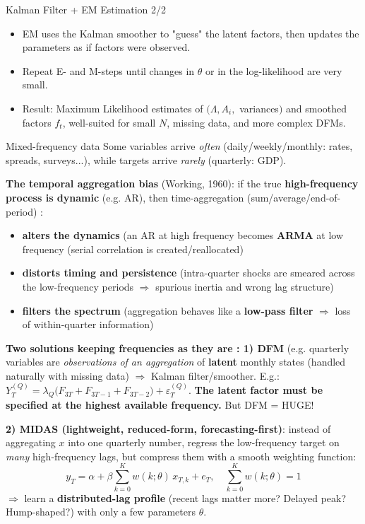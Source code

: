 \documentclass{beamer}
\begin{document}
\begin{frame}[label=em-intuition]{Kalman Filter + EM Estimation 2/2}
\medskip


\begin{itemize}
  \item EM uses the Kalman smoother to "guess" the latent factors,
        then updates the parameters as if factors were observed.
  \item Repeat E- and M-steps until changes in $\theta$ or in the log-likelihood are very small.
  \item Result: Maximum Likelihood estimates of $(\Lambda, A_i,$ variances$)$ and smoothed factors $f_t$,
        well-suited for small $N$, missing data, and more complex DFMs.
\end{itemize}

\end{frame}



\begin{frame}[label=MF]{Mixed-frequency data}
\scriptsize
Some variables arrive \emph{often} (daily/weekly/monthly: rates, spreads, surveys...), while targets arrive \emph{rarely} (quarterly: GDP).

\medskip
\textbf{The temporal aggregation bias} (Working, 1960): if the true\textbf{ high-frequency process is dynamic} (e.g. AR), then time-aggregation (sum/average/end-of-period) :
\begin{itemize}
\item \textbf{alters the dynamics} (an AR at high frequency becomes \textbf{ARMA} at low frequency (serial correlation is created/reallocated)
\item \textbf{distorts timing and persistence} (intra-quarter shocks are smeared across the low-frequency periods $\Rightarrow$ spurious inertia and wrong lag structure)
\item \textbf{filters the spectrum} (aggregation behaves like a \textbf{low-pass filter} $\Rightarrow$ loss of within-quarter information)
\end{itemize}

\textbf{Two solutions keeping frequencies as they are : 1) DFM} (e.g. quarterly variables are \emph{observations of an aggregation} of\textbf{ latent} monthly states (handled naturally with missing data) $\Rightarrow$ Kalman filter/smoother. E.g.: $Y_T^{(Q)} = \lambda_Q \bigl( F_{3T} + F_{3T-1} + F_{3T-2} \bigr) + \varepsilon_T^{(Q)}$. \textbf{The latent factor must be specified at the highest available frequency.} But DFM = HUGE!

\medskip
\textbf{2) MIDAS (lightweight, reduced-form, forecasting-first)}: instead of aggregating $x$ into one quarterly number, regress the low-frequency target on \emph{many} high-frequency lags, but compress them with a smooth weighting function:
\[
y_T = \alpha + \beta \sum_{k=0}^{K} w(k;\theta)\, x_{T,k} + e_T,
\quad
\sum_{k=0}^K w(k;\theta)=1
\]
$\Longrightarrow$ learn a \textbf{distributed-lag profile} (recent lags matter more? Delayed peak? Hump-shaped?) with only a few parameters $\theta$.
\end{frame}
\end{document}
